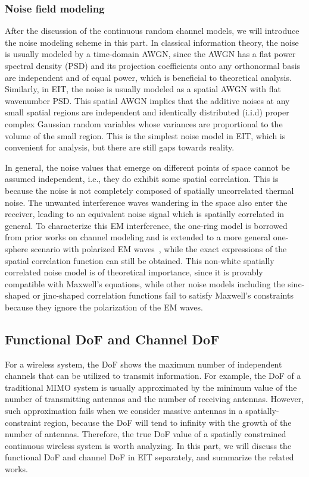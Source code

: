 \documentclass[journal,twocolumn]{IEEEtran}
\begin{document}
\subsubsection{Noise field modeling}
After the discussion of the continuous random channel models, we will introduce the noise modeling scheme in this part. In classical information theory, the noise is usually modeled by a time-domain AWGN, since the AWGN has a flat power spectral density (PSD) and its projection coefficients onto any orthonormal basis are independent and of equal power, which is beneficial to theoretical analysis. 
Similarly, in EIT, the noise is usually modeled as a spatial AWGN with flat wavenumber PSD. This spatial AWGN implies that the additive noises at any small spatial regions are independent and identically distributed (i.i.d) proper complex Gaussian random variables whose variances are proportional to the volume of the small region. This is the simplest noise model in EIT, which is convenient for analysis, but there are still gaps towards reality. 

In general, the noise values that emerge on different points of space cannot be assumed independent, i.e., they do exhibit some spatial correlation. 
This is because the noise is not completely composed of spatially uncorrelated thermal noise. 
The unwanted interference waves wandering in the space also enter the receiver, leading to an equivalent noise signal which is spatially correlated in general. 
To characterize this EM interference, the one-ring model is borrowed from prior works on channel modeling and is extended to a more general one-sphere scenario with polarized EM waves~\cite{wan2022mutual}, while the exact expressions of the spatial correlation function can still be obtained. 
This non-white spatially correlated noise model is of theoretical importance, since it is provably compatible with Maxwell's equations, while other noise models including the sinc-shaped or jinc-shaped correlation functions fail to satisfy Maxwell's constraints because they ignore the polarization of the EM waves. 


\subsection{Functional DoF and Channel DoF}
\label{Sec_3_Subsec_2}
For a wireless system, the DoF shows the maximum number of independent channels that can be utilized to transmit information. For example, the DoF of a traditional MIMO system is usually approximated by the minimum value of the number of transmitting antennas and the number of receiving antennas. However, such approximation fails when we consider massive antennas in a spatially-constraint region, because the DoF will tend to infinity with the growth of the number of antennas. Therefore, the true DoF value of a spatially constrained continuous wireless system is worth analyzing. In this part, we will discuss the functional DoF and channel DoF in EIT separately, and summarize the related works.
\end{document}
